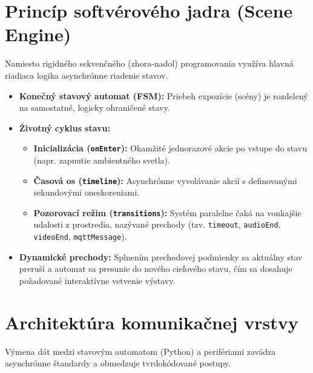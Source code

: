 \section{Princíp softvérového jadra (Scene Engine)}
\label{SoftverovArchitektura}

Namiesto rigidného sekvenčného (zhora-nadol) programovania využíva hlavná riadiaca logika asynchrónne riadenie stavov.

\begin{itemize}
    \item \textbf{Konečný stavový automat (FSM):} Priebeh expozície (scény) je rozdelený na samostatné, logicky ohraničené stavy.
    \item \textbf{Životný cyklus stavu:}
    \begin{itemize}
        \item \textbf{Inicializácia (\texttt{onEnter}):} Okamžité jednorazové akcie po vstupe do stavu (napr. zapnutie ambientného svetla).
        \item \textbf{Časová os (\texttt{timeline}):} Asynchrónne vyvolávanie akcií s definovanými sekundovými oneskoreniami.
        \item \textbf{Pozorovací režim (\texttt{transitions}):} Systém paralelne čaká na vonkajšie udalosti z prostredia, nazývané prechody (tzv. \texttt{timeout}, \texttt{audioEnd}, \texttt{videoEnd}, \texttt{mqttMessage}).
    \end{itemize}
    \item \textbf{Dynamické prechody:} Splnením prechodovej podmienky sa aktuálny stav preruší a automat sa presunie do nového cieľového stavu, čím sa dosahuje požadované interaktívne vetvenie výstavy.
\end{itemize}

\section{Architektúra komunikačnej vrstvy}
\label{KomunikacnaVrstva}

Výmena dát medzi stavovým automatom (Python) a perifériami zavádza asynchrónne štandardy a obmedzuje tvrdokódované postupy.

